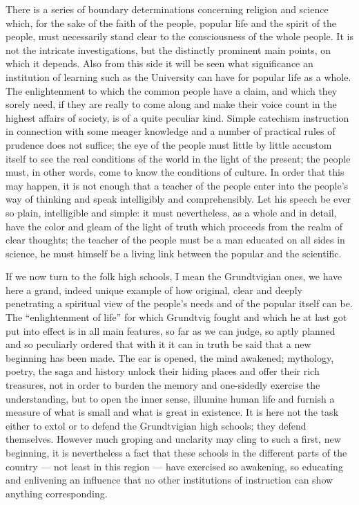 \documentclass[12pt,a4paper,openany]{book}
\newcommand{\opage}[1]{\marginnote{\footnotesize\textit{[#1]}}}
\begin{document}
There is a series of boundary determinations concerning
religion and science which, for the sake of the faith of the people, popular life
and the spirit of the people, must necessarily stand
clear to the consciousness of the whole people. It is not the intricate
investigations, but the distinctly prominent
main points, on which it depends. Also from
this side it will be seen what significance an
institution of learning such as the University can have for popular life
as a whole. The enlightenment to which the common people
have a claim, and which they sorely need, if they
are really to come along and make their voice count
in the highest affairs of society, is of a quite
peculiar kind. Simple catechism instruction in
connection with some meager knowledge and a
number of practical rules of prudence does not suffice; the eye of the people
must little by little accustom itself to see the
real conditions of the world in the light of the present; the people must,
in other words, come to know the conditions of culture. In order that
this may happen, it is not enough that a teacher of the people
enter into the people's way of thinking and speak intelligibly
and comprehensibly. Let his speech be ever so plain, intelligible
and simple: it must nevertheless, as a whole and in
detail, have the color and gleam of the light of truth
\setcounter{footnote}{0}%
\opage{134}which proceeds from the realm of clear thoughts; the teacher of the people
must be a man educated on all sides in science, he
must himself be a living link between the popular
and the scientific.

If we now turn to the folk high schools, I mean the
Grundtvigian ones, we have here a grand, indeed unique
example of how original, clear and deeply penetrating
a spiritual view of the people's needs and of the popular
itself can be. The ``enlightenment of life'' for which
Grundtvig fought and which he at last got put into effect
is in all main features, so far as we can judge, so aptly
planned and so peculiarly ordered that with it it can in truth
be said that a new beginning has been made. The ear is opened,
the mind awakened; mythology, poetry, the saga and history
unlock their hiding places and offer their rich treasures,
not in order to burden the memory and one-sidedly exercise the understanding,
but to open the inner sense, illumine
human life and furnish a measure of what is
small and what is great in existence. It is here
not the task either to extol or to defend the Grundtvigian
high schools; they defend themselves. However much
groping and unclarity may cling to such a
first, new beginning, it is nevertheless a fact
that these schools in the different parts of the country --- not
least in this region --- have exercised so awakening,
so educating and enlivening an influence that no other
institutions of instruction can show anything corresponding.
\end{document}

